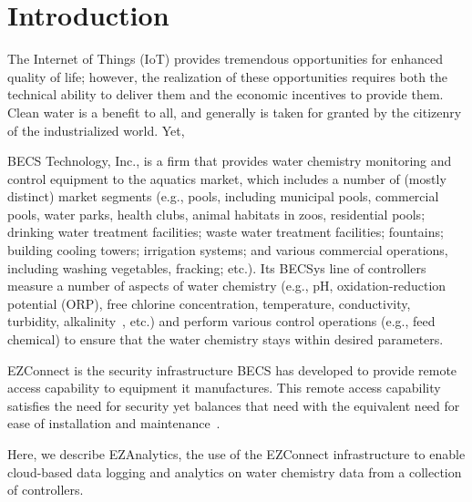 \section{Introduction}
\label{sec:intro}

The Internet of Things (IoT) provides tremendous opportunities for
enhanced quality of life; however, the realization of these opportunities
requires both the technical ability to deliver them and the economic
incentives to provide them.
Clean water is a benefit to all, and generally is taken for granted
by the citizenry of the industrialized world.
Yet, 

BECS Technology, Inc., is a firm that provides water chemistry monitoring
and control equipment to the aquatics market, which includes a number
of (mostly distinct) market segments (e.g., pools, including municipal pools,
commercial pools, water parks, health clubs, animal habitats in zoos,
residential pools; drinking water treatment facilities; waste water
treatment facilities; fountains; building cooling towers; irrigation
systems; and various commercial operations, including washing vegetables,
fracking; etc.).
Its BECSys\texttrademark{} line of controllers measure
a number of aspects of water chemistry (e.g., pH,
oxidation-reduction potential (ORP), free chlorine concentration,
temperature, conductivity, turbidity, alkalinity~\cite{cew18},
etc.) and perform various control operations (e.g., feed chemical)
to ensure that the water chemistry stays within desired parameters.

EZConnect\texttrademark{}
is the security infrastructure BECS has developed to provide
remote access capability to equipment it manufactures.  This remote
access capability satisfies the need for security yet balances
that need with the equivalent need for ease of installation and
maintenance~\cite{ezconnect,ccgss18}.

Here, we describe EZAnalytics\texttrademark{}, the use of the EZConnect infrastructure to enable
cloud-based data logging and analytics on water chemistry data from a
collection of controllers.

